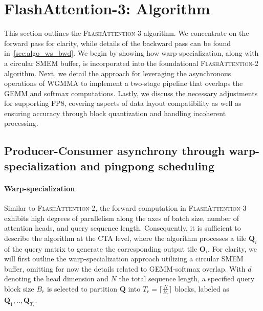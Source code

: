 \section{FlashAttention-3: Algorithm}
\label{sec:algo}

This section outlines the \textsc{FlashAttention-3} algorithm. We concentrate on the forward pass for clarity, while details of the backward pass can be found in~\cref{sec:algo_ws_bwd}. We begin by showing how warp-specialization, along with a circular SMEM buffer, is incorporated into the foundational \textsc{FlashAttention-2} algorithm. Next, we detail the approach for leveraging the asynchronous operations of WGMMA to implement a two-stage pipeline that overlaps the GEMM and softmax computations. Lastly, we discuss the necessary adjustments for supporting FP8, covering aspects of data layout compatibility as well as ensuring accuracy through block quantization and handling incoherent processing.

\subsection{Producer-Consumer asynchrony through warp-specialization and pingpong scheduling}
\label{sec:algo_ws}

\paragraph{Warp-specialization}
Similar to \textsc{FlashAttention-2}, the forward computation in \textsc{FlashAttention-3} exhibits high degrees of parallelism along the axes of batch size, number of attention heads, and query sequence length. Consequently, it is sufficient to describe the algorithm at the CTA level, where the algorithm processes a tile $\mathbf{Q}_i$ of the query matrix to generate the corresponding output tile $\mathbf{O}_i$. For clarity, we will first outline the warp-specialization approach utilizing a circular SMEM buffer, omitting for now the details related to GEMM-softmax overlap. With $d$ denoting the head dimension and $N$ the total sequence length, a specified query block size $B_r$ is selected to partition $\mathbf{Q}$ into $T_r = \lceil \frac{N}{B_r} \rceil$ blocks, labeled as $\mathbf{Q}_1, .., \mathbf{Q}_{T_r}$.

